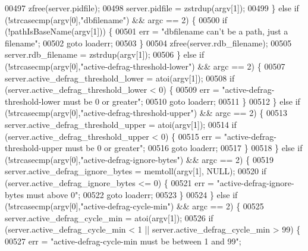 \begin{DoxyCode}
{{00497             zfree(server.pidfile);
00498             server.pidfile = zstrdup(argv[1]);
00499         \} \textcolor{keywordflow}{else} \textcolor{keywordflow}{if} (!strcasecmp(argv[0],\textcolor{stringliteral}{"dbfilename"}) && argc == 2) \{
00500             \textcolor{keywordflow}{if} (!pathIsBaseName(argv[1])) \{
00501                 err = \textcolor{stringliteral}{"dbfilename can't be a path, just a filename"};
00502                 \textcolor{keywordflow}{goto} loaderr;
00503             \}
00504             zfree(server.rdb\_filename);
00505             server.rdb\_filename = zstrdup(argv[1]);
00506         \} \textcolor{keywordflow}{else} \textcolor{keywordflow}{if} (!strcasecmp(argv[0],\textcolor{stringliteral}{"active-defrag-threshold-lower"}) && argc == 2) \{
00507             server.active\_defrag\_threshold\_lower = atoi(argv[1]);
00508             \textcolor{keywordflow}{if} (server.active\_defrag\_threshold\_lower < 0) \{
00509                 err = \textcolor{stringliteral}{"active-defrag-threshold-lower must be 0 or greater"};
00510                 \textcolor{keywordflow}{goto} loaderr;
00511             \}
00512         \} \textcolor{keywordflow}{else} \textcolor{keywordflow}{if} (!strcasecmp(argv[0],\textcolor{stringliteral}{"active-defrag-threshold-upper"}) && argc == 2) \{
00513             server.active\_defrag\_threshold\_upper = atoi(argv[1]);
00514             \textcolor{keywordflow}{if} (server.active\_defrag\_threshold\_upper < 0) \{
00515                 err = \textcolor{stringliteral}{"active-defrag-threshold-upper must be 0 or greater"};
00516                 \textcolor{keywordflow}{goto} loaderr;
00517             \}
00518         \} \textcolor{keywordflow}{else} \textcolor{keywordflow}{if} (!strcasecmp(argv[0],\textcolor{stringliteral}{"active-defrag-ignore-bytes"}) && argc == 2) \{
00519             server.active\_defrag\_ignore\_bytes = memtoll(argv[1], NULL);
00520             \textcolor{keywordflow}{if} (server.active\_defrag\_ignore\_bytes <= 0) \{
00521                 err = \textcolor{stringliteral}{"active-defrag-ignore-bytes must above 0"};
00522                 \textcolor{keywordflow}{goto} loaderr;
00523             \}
00524         \} \textcolor{keywordflow}{else} \textcolor{keywordflow}{if} (!strcasecmp(argv[0],\textcolor{stringliteral}{"active-defrag-cycle-min"}) && argc == 2) \{
00525             server.active\_defrag\_cycle\_min = atoi(argv[1]);
00526             \textcolor{keywordflow}{if} (server.active\_defrag\_cycle\_min < 1 || server.active\_defrag\_cycle\_min > 99) \{
00527                 err = \textcolor{stringliteral}{"active-defrag-cycle-min must be between 1 and 99"};
}}
\end{DoxyCode}

